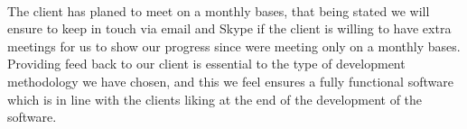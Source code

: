 \newline \\
The client has planed to meet on a monthly bases, that being stated we will ensure to keep in touch
via email and Skype if the client is willing to have extra meetings for us to show our progress since	
were meeting only on a monthly bases.
\newline \\
Providing feed back to our client is essential to the type of development methodology we have chosen,
and this we feel ensures a fully functional software which is in line with the clients liking at the
end of the development of the software.
